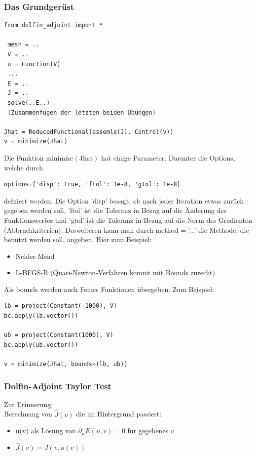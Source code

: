 \documentclass[a4paper, 12pt]{scrartcl}
\begin{document}
\subsubsection{Das Grundgerüst}
\begin{lstlisting}
from dolfin_adjoint import *
 
 mesh = ..
 V = ..
 u = Function(V) 
 ...
 E = ..
 J = ..
 solve(..E..)
 (Zusammenfügen der letzten beiden Übungen)

Jhat = ReducedFunctional(assemle(J), Control(v))
v = minimize(Jhat)
\end{lstlisting}


Die Funktion $\mathrm{minimize(Jhat)}$ hat einige Parameter. Darunter die Options, welche durch 
\begin{lstlisting}
options={'disp': True, 'ftol': 1e-8, 'gtol': 1e-8}
\end{lstlisting}
defniert werden. Die Option 'disp' besagt, ob nach jeder Iteration etwas zurück gegeben werden soll, 'ftol' ist die Toleranz in Bezug auf die Änderung des Funktionswertes und 'gtol' ist die Toleranz in Bezug auf die Norm des Gradienten (Abbruchkriterien). Desweiteren kann man durch method = '...' die Methode, die benutzt werden soll, angeben. Hier zum Beispiel:
\begin{itemize}
	\item Nelder-Mead
	\item L-BFGS-B \qquad      (Quasi-Newton-Verfahren kommt mit Bounds zurecht)
\end{itemize}
Als bounds werden auch Fenics Funktionen übergeben. Zum Beispiel:

\begin{lstlisting}
lb = project(Constant(-1000), V)
bc.apply(lb.vector())

ub = project(Constant(1000), V)
bc.apply(ub.vector())

v = minimize(Jhat, bounds=(lb, ub))
\end{lstlisting}


\subsubsection{Dolfin-Adjoint Taylor Test}
Zur Erinnerung: \\
Berechnung von $\hat{J}(v)$ die im Hintergrund passiert:
\begin{itemize}
	\item u(v) als Lösung von $\partial_u E(u, v) = 0$ für gegebenes $v$
	\item $\hat{J}(v) = J(v, u(v))$
\end{itemize}
\end{document}
